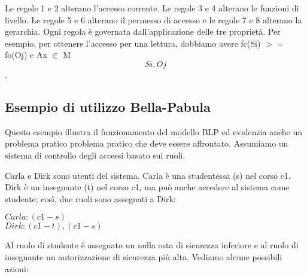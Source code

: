 Le regole 1 e 2 alterano l'accesso corrente. Le regole 3 e 4 alterano le funzioni di livello. Le regole 5 e 6 alterano il permesso di accesso e le regole 7 e 8 alterano la gerarchia. Ogni regola è governata dall'applicazione delle tre proprietà. Per esempio, per ottenere l'accesso per una lettura, dobbiamo avere fc(Si) $>=$ fo(Oj) e Ax $\in$ M\[Si, Oj\].
\subsection{Esempio di utilizzo Bella-Pabula}
Questo esempio illustra il funzionamento del modello BLP ed evidenzia anche un problema pratico problema pratico che deve essere affrontato. Assumiamo un sistema di controllo degli accessi basato sui ruoli. 

\singlespacing

Carla e Dirk sono utenti del sistema. Carla è una studentessa (s) nel corso c1. Dirk è un insegnante (t) nel corso c1, ma può anche accedere al sistema come studente; così, due ruoli sono assegnati a Dirk:

\begin{center}
    $Carla: (c1-s)$\\
    $Dirk: (c1-t), (c1-s)$
\end{center}

Al ruolo di studente è assegnato un nulla osta di sicurezza inferiore e al ruolo di insegnante un autorizzazione di sicurezza più alta. Vediamo alcune possibili azioni:


